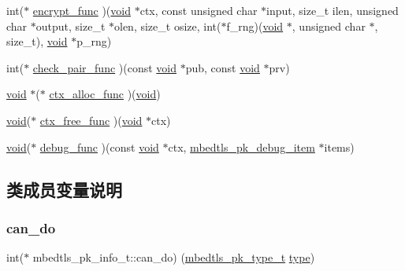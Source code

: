 \begin{DoxyCompactItemize}
\item 
int($\ast$ \hyperlink{structmbedtls__pk__info__t_ae6aa9a5ebdd68db1fa364d786d9a1118}{encrypt\+\_\+func} )(\hyperlink{interfacevoid}{void} $\ast$ctx, const unsigned char $\ast$input, size\+\_\+t ilen, unsigned char $\ast$output, size\+\_\+t $\ast$olen, size\+\_\+t osize, int($\ast$f\+\_\+rng)(\hyperlink{interfacevoid}{void} $\ast$, unsigned char $\ast$, size\+\_\+t), \hyperlink{interfacevoid}{void} $\ast$p\+\_\+rng)
\item 
int($\ast$ \hyperlink{structmbedtls__pk__info__t_ad370e83d7f46d53d963b2d88593f2589}{check\+\_\+pair\+\_\+func} )(const \hyperlink{interfacevoid}{void} $\ast$pub, const \hyperlink{interfacevoid}{void} $\ast$prv)
\item 
\hyperlink{interfacevoid}{void} $\ast$($\ast$ \hyperlink{structmbedtls__pk__info__t_af188821fd46e2d130bd0b36f7ad201ec}{ctx\+\_\+alloc\+\_\+func} )(\hyperlink{interfacevoid}{void})
\item 
\hyperlink{interfacevoid}{void}($\ast$ \hyperlink{structmbedtls__pk__info__t_a4741fa700325cbdb932e43a1ce04067e}{ctx\+\_\+free\+\_\+func} )(\hyperlink{interfacevoid}{void} $\ast$ctx)
\item 
\hyperlink{interfacevoid}{void}($\ast$ \hyperlink{structmbedtls__pk__info__t_a61420d1702a434ff7084147cdc86bed3}{debug\+\_\+func} )(const \hyperlink{interfacevoid}{void} $\ast$ctx, \hyperlink{structmbedtls__pk__debug__item}{mbedtls\+\_\+pk\+\_\+debug\+\_\+item} $\ast$items)
\end{DoxyCompactItemize}


\subsection{类成员变量说明}
\mbox{\label{structmbedtls__pk__info__t_af64d12bcc605260ebfbd24a8c6258e1f}} 
\subsubsection{\texorpdfstring{can\+\_\+do}{can\_do}}
{\footnotesize\ttfamily int($\ast$ mbedtls\+\_\+pk\+\_\+info\+\_\+t\+::can\+\_\+do) (\hyperlink{pk_8h_a3fe41eff5605ae727eb9d28dad297020}{mbedtls\+\_\+pk\+\_\+type\+\_\+t} \hyperlink{structmbedtls__pk__info__t_a1290aa516e4b5889952f56edf331c313}{type})}

